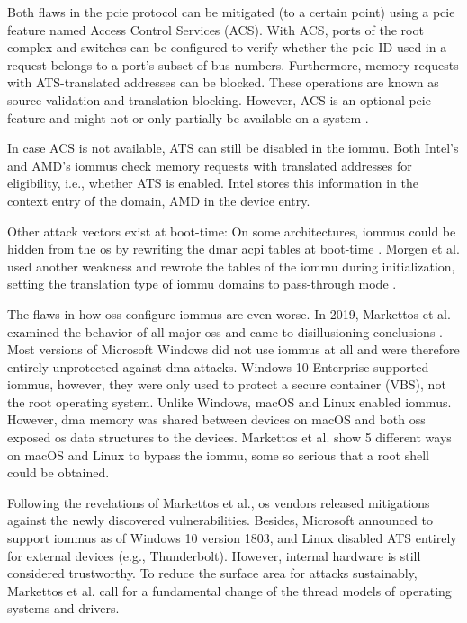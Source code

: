 Both flaws in the \ac{pcie} protocol can be mitigated (to a certain point) using
a \ac{pcie} feature named Access Control Services (ACS). With ACS, ports of the
root complex and switches can be configured to verify whether the \ac{pcie} ID
used in a request belongs to a port's subset of bus numbers. Furthermore, memory
requests with ATS-translated addresses can be blocked. These operations are
known as source validation and translation blocking. However, ACS is an optional
\ac{pcie} feature and might not or only partially be available on a system
\cite[p.~582]{pcie2017specification}.

In case ACS is not available, ATS can still be disabled in the \ac{iommu}. Both
Intel's and AMD's \acp{iommu} check memory requests with translated addresses
for eligibility, i.e., whether ATS is enabled. Intel stores this information in
the context entry of the domain, AMD in the device entry.

Other attack vectors exist at boot-time: On some architectures, \acp{iommu}
could be hidden from the \ac{os} by rewriting the \ac{dmar} \ac{acpi} tables at
boot-time \cite{wojtczuk2009another}. Morgen et al. used another weakness and
rewrote the tables of the \ac{iommu} during initialization, setting the
translation type of \ac{iommu} domains to pass-through mode
\cite{morgan2018iommu}.

The flaws in how \aclp{os} configure \acp{iommu} are even worse. In 2019,
Markettos et al. examined the behavior of all major \acp{os} and came to
disillusioning conclusions \cite{markettos2019thunderclap}. Most versions of
Microsoft Windows did not use \acp{iommu} at all and were therefore entirely
unprotected against \ac{dma} attacks. Windows 10 Enterprise supported
\acp{iommu}, however, they were only used to protect a secure container (VBS),
not the root operating system. Unlike Windows, macOS and Linux enabled
\acp{iommu}. However, \ac{dma} memory was shared between devices on macOS and
both \aclp{os} exposed \ac{os} data structures to the devices. Markettos et al.
show 5 different ways on macOS and Linux to bypass the \ac{iommu}, some so
serious that a root shell could be obtained.

Following the revelations of Markettos et al., \ac{os} vendors released
mitigations against the newly discovered vulnerabilities. Besides, Microsoft
announced to support \acp{iommu} as of Windows 10 version 1803, and Linux
disabled ATS entirely for external devices (e.g., Thunderbolt). However,
internal hardware is still considered trustworthy. To reduce the surface area
for attacks sustainably, Markettos et al. call for a fundamental change of the
thread models of operating systems and drivers.


